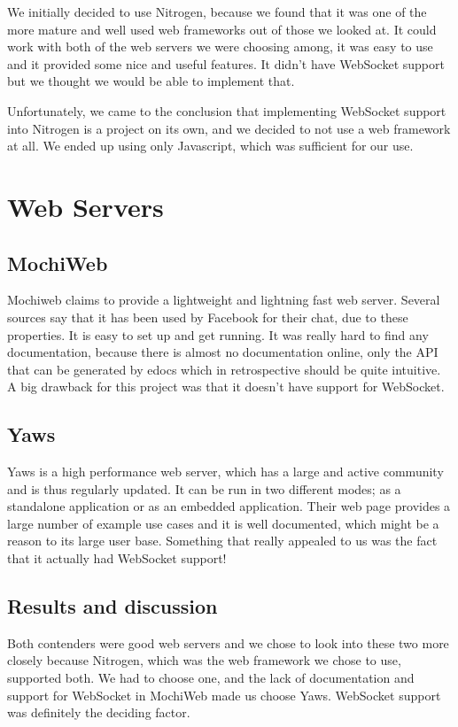 \documentclass[11pt,a4paper]{report}
\begin{document}
We initially decided to use Nitrogen, because we found that it was one of the
more mature and well used web frameworks out of those we looked at. It could
work with both of the web servers we were choosing among, it was easy to use and
it provided some nice and useful features. It didn't have WebSocket support but
we thought we would be able to implement that.

Unfortunately, we came to the conclusion that implementing WebSocket support
into Nitrogen is a project on its own, and we decided to not use a web
framework at all. We ended up using only Javascript, which was sufficient for
our use.

\section{Web Servers}
\subsection{MochiWeb}
Mochiweb\cite{mochiweb} claims to provide a lightweight and lightning fast
web server. Several sources say that it has been used by Facebook for their
chat\cite{fb_chat}\cite{fb_pres}, due to these properties. It is easy to set up
and get running. It was really hard to find any documentation, because there is
almost no documentation online, only the API that can be generated by edocs
which in retrospective should be quite intuitive. A big drawback for this
project was that it doesn't have support for WebSocket.

\subsection{Yaws}
Yaws\cite{yaws} is a high performance web server, which has a large and active
community and is thus regularly updated. It can be run in two different modes;
as a standalone application or as an embedded application. Their web page
provides a large number of example use cases and it is well documented, which
might be a reason to its large user base. Something that really appealed to us
was the fact that it actually had WebSocket support!

\subsection{Results and discussion}
Both contenders were good web servers and we chose to look into these two more
closely because Nitrogen, which was the web framework we chose to use,
supported both. We had to choose one, and the lack of documentation and support
for WebSocket in MochiWeb made us choose Yaws. WebSocket support was definitely
the deciding factor.
\end{document}

